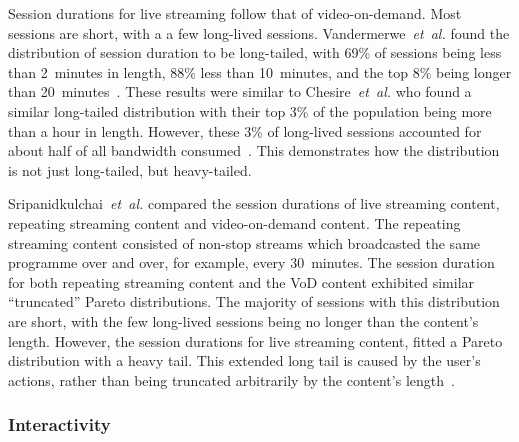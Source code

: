     Session durations for live streaming follow that of video-on-demand. Most sessions are short, with a a few long-lived sessions. Vandermerwe~\emph{et~al.} found the distribution of session duration to be long-tailed, with 69\% of sessions being less than 2~minutes in length, 88\% less than 10~minutes, and the top 8\% being longer than 20~minutes~\cite{vandermerwe2002svt}. These results were similar to Chesire~\emph{et~al.} who found a similar long-tailed distribution with their top 3\% of the population being more than a hour in length. However, these 3\% of long-lived sessions accounted for about half of all bandwidth consumed~\cite{chesire2001maa}. This demonstrates how the distribution is not just long-tailed, but heavy-tailed.

    Sripanidkulchai~\emph{et~al.} compared the session durations of live streaming content, repeating streaming content and video-on-demand content. The repeating streaming content consisted of non-stop streams which broadcasted the same programme over and over, for example, every 30~minutes. The session duration for both repeating streaming content and the VoD content exhibited similar ``truncated'' Pareto distributions. The majority of sessions with this distribution are short, with the few long-lived sessions being no longer than the content's length. However, the session durations for live streaming content, fitted a Pareto distribution with a heavy tail. This extended long tail is caused by the user's actions, rather than being truncated arbitrarily by the content's length~\cite{sripanidkulchai2004als}.




\subsubsection{Interactivity}


